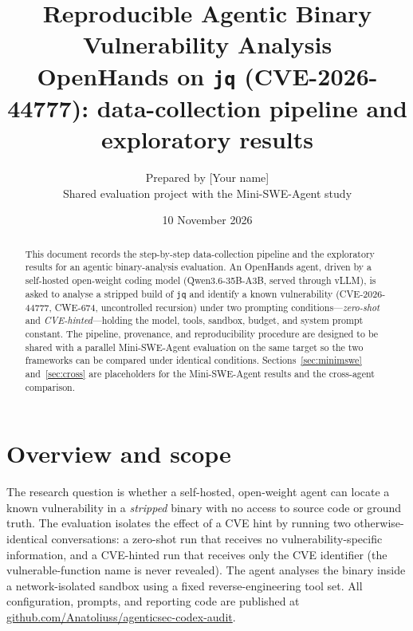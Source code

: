 \documentclass[11pt]{article}
\title{\vspace{-1.5em}\textbf{Reproducible Agentic Binary Vulnerability Analysis}\\[0.3em]
\large OpenHands on \texttt{jq} (CVE-2026-44777): data-collection pipeline and exploratory results}
\author{Prepared by [Your name]\\[-0.2em]\small Shared evaluation project with the Mini-SWE-Agent study}
\date{10 November 2026}
\newcommand{\repo}{\href{https://github.com/Anatoliuss/agenticsec-codex-audit}{github.com/Anatoliuss/agenticsec-codex-audit}}
\begin{document}
\maketitle

\begin{abstract}
\noindent This document records the step-by-step data-collection pipeline and the
exploratory results for an agentic binary-analysis evaluation. An OpenHands agent,
driven by a self-hosted open-weight coding model (Qwen3.6-35B-A3B, served through
vLLM), is asked to analyse a stripped build of \texttt{jq} and identify a known
vulnerability (CVE-2026-44777, CWE-674, uncontrolled recursion) under two prompting
conditions---\emph{zero-shot} and \emph{CVE-hinted}---holding the model, tools, sandbox,
budget, and system prompt constant. The pipeline, provenance, and reproducibility
procedure are designed to be shared with a parallel Mini-SWE-Agent evaluation on the
same target so the two frameworks can be compared under identical conditions.
Sections~\ref{sec:minimswe} and~\ref{sec:cross} are placeholders for the Mini-SWE-Agent
results and the cross-agent comparison.
\end{abstract}

\section{Overview and scope}
The research question is whether a self-hosted, open-weight agent can locate a known
vulnerability in a \emph{stripped} binary with no access to source code or ground truth.
The evaluation isolates the effect of a CVE hint by running two otherwise-identical
conversations: a zero-shot run that receives no vulnerability-specific information, and a
CVE-hinted run that receives only the CVE identifier (the vulnerable-function name is never
revealed). The agent analyses the binary inside a network-isolated sandbox using a fixed
reverse-engineering tool set. All configuration, prompts, and reporting code are published
at \repo.
\end{document}
